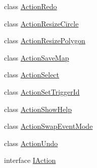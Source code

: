 \begin{DoxyCompactItemize}
\item 
class \hyperlink{classgearit_1_1src_1_1editor_1_1map_1_1action_1_1_action_redo}{Action\+Redo}
\item 
class \hyperlink{classgearit_1_1src_1_1editor_1_1map_1_1action_1_1_action_resize_circle}{Action\+Resize\+Circle}
\item 
class \hyperlink{classgearit_1_1src_1_1editor_1_1map_1_1action_1_1_action_resize_polygon}{Action\+Resize\+Polygon}
\item 
class \hyperlink{classgearit_1_1src_1_1editor_1_1map_1_1action_1_1_action_save_map}{Action\+Save\+Map}
\item 
class \hyperlink{classgearit_1_1src_1_1editor_1_1map_1_1action_1_1_action_select}{Action\+Select}
\item 
class \hyperlink{classgearit_1_1src_1_1editor_1_1map_1_1action_1_1_action_set_trigger_id}{Action\+Set\+Trigger\+Id}
\item 
class \hyperlink{classgearit_1_1src_1_1editor_1_1map_1_1action_1_1_action_show_help}{Action\+Show\+Help}
\item 
class \hyperlink{classgearit_1_1src_1_1editor_1_1map_1_1action_1_1_action_swap_event_mode}{Action\+Swap\+Event\+Mode}
\item 
class \hyperlink{classgearit_1_1src_1_1editor_1_1map_1_1action_1_1_action_undo}{Action\+Undo}
\item 
interface \hyperlink{interfacegearit_1_1src_1_1editor_1_1map_1_1action_1_1_i_action}{I\+Action}
\end{DoxyCompactItemize}
